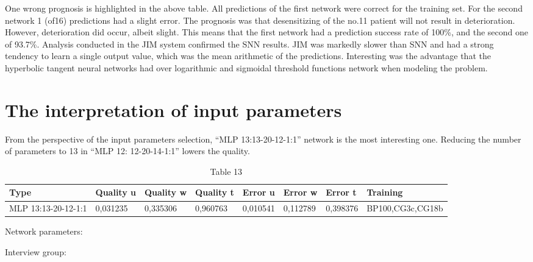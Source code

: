 \documentclass[10pt,oneside]{memoir}
\begin{document}
One wrong prognosis is highlighted in the above table. All predictions of the first network were correct for the training set. For the second network 1 (of16) predictions had a slight error. The prognosis was that desensitizing of the no.11 patient will not result in deterioration. However, deterioration did occur, albeit slight. This means that the first network had a prediction success rate of 100\%, and the second one of 93.7\%.
Analysis conducted in the JIM system confirmed the SNN results. JIM was markedly slower than SNN and had a strong tendency to learn a single output value, which was the mean arithmetic of the predictions. Interesting was the advantage that the hyperbolic tangent neural networks had over logarithmic and sigmoidal threshold functions network when modeling the problem.


\section{The interpretation of input parameters}
\label{theinterpretationofinputparameters}

From the perspective of the input parameters selection, ``MLP 13:13-20-12-1:1'' network is the most interesting one. Reducing the number of parameters to 13 in ``MLP 12: 12-20-14-1:1'' lowers the quality.


\begin{table}[htbp]
\begin{minipage}{\linewidth}
\setlength{\tymax}{0.5\linewidth}
\centering
\small
\caption{Table 13}
\label{table13}
\begin{tabulary}{\linewidth}{@{}l@{}l@{}l@{}l@{}l@{}l@{}l@{}l@{}} \\ \toprule 
Type&Quality u&Quality w&Quality t&Error u&Error w&Error t&Training \\\midrule
MLP 13:13-20-12-1:1&0,031235&0,335306&0,960763&0,010541&0,112789&0,398376&BP100,CG3c,CG18b \\

		\bottomrule
	\end{tabulary}
\end{minipage}
\end{table}

Network parameters:


Interview group:
\end{document}
